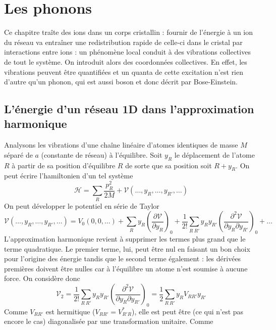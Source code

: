 \chapter{Les phonons}
Ce chapitre traîte des ions dans un corps cristallin : fournir de l'énergie à 
un ion du réseau va entraîner une redistribution rapide de celle-ci dans le 
cristal par interactions entre ions : un phénomène local conduit à des vibrations 
collectives de tout le système. On introduit alors des coordonnées collectives. En 
effet, les vibrations peuvent être quantifiées et un quanta de cette excitation 
n'est rien d'autre qu'un phonon, qui est aussi boson et donc décrit par 
Bose-Einstein.

\section{L'énergie d'un réseau 1D dans l'approximation harmonique}
Analysons les vibrations d'une chaîne linéaire d'atomes identiques de masse 
$M$ séparé de $a$ (constante de réseau) à l'équilibre. Soit $y_R$ le déplacement 
de l'atome $R$ à partir de sa position d'équilibre $R$ de sorte que sa position 
soit $R+y_R$. On peut écrire l'hamiltonien d'un tel système 
\begin{equation}
\mathcal{H} = \sum_R \dfrac{p_R^2}{2M}+\mathcal{V}(\dots,y_R,\dots,y_{R'},\dots)
\end{equation}
On peut développer le potentiel en série de Taylor
\begin{equation}
\mathcal{V}(\dots,y_R,\dots,y_{R'},\dots) = V_0(0,0,\dots) + \sum_R y_R\left(
\dfrac{\partial \mathcal{V}}{\partial y_R}\right)_0 + \frac{1}{2!}\sum_{R\ R'} 
y_Ry_{R'}\left(\dfrac{\partial^2\mathcal{V}}{\partial y_R\partial y_{R'}}\right)_0 
+\dots
\end{equation}
L'approximation harmonique revient à supprimer les termes plus grand que le 
terme quadratique. Le premier terme, lui, peut être nul en faisant un bon choix 
pour l'origine des énergie tandis que le second terme également : les dérivées 
premières doivent être nulles car à l'équilibre un atome n'est soumise à aucune 
force. On considère donc
\begin{equation}
\mathcal{V}_2 =  \frac{1}{2!}\sum_{R\ R'} 
y_Ry_{R'}\left(\dfrac{\partial^2\mathcal{V}}{\partial y_R\partial y_{R'}}\right)_0 =
\dfrac{1}{2}\sum_{R\ R'} y_RV_{RR'}y_{R'}
\end{equation} 
Comme $V_{RR'}$ est hermitique ($V_{RR'} = V_{R'R}^*$), elle est peut être (ce 
qui n'est pas encore le cas) diagonalisée par une transformation unitaire. Comme 
